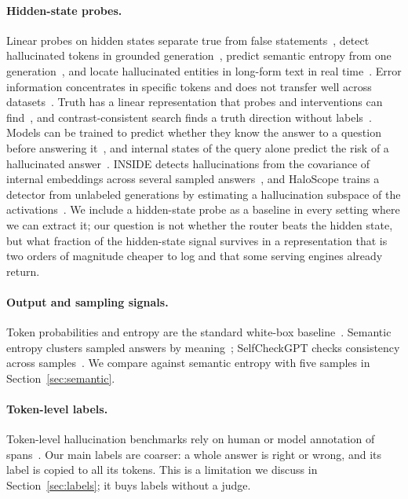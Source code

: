 \documentclass[11pt]{article}
\begin{document}
\paragraph{Hidden-state probes.}
Linear probes on hidden states separate true from false statements~\citep{azaria2023internal}, detect hallucinated tokens in grounded generation~\citep{chwang2024androids}, predict semantic entropy from one generation~\citep{kossen2024semantic}, and locate hallucinated entities in long-form text in real time~\citep{obeso2025realtime}.
Error information concentrates in specific tokens and does not transfer well across datasets~\citep{orgad2025llms}.
Truth has a linear representation that probes and interventions can find~\citep{marks2024geometry}, and contrast-consistent search finds a truth direction without labels~\citep{burns2023discovering}.
Models can be trained to predict whether they know the answer to a question before answering it~\citep{kadavath2022language}, and internal states of the query alone predict the risk of a hallucinated answer~\citep{ji2024llm}.
INSIDE detects hallucinations from the covariance of internal embeddings across several sampled answers~\citep{chen2024inside}, and HaloScope trains a detector from unlabeled generations by estimating a hallucination subspace of the activations~\citep{du2024haloscope}.
We include a hidden-state probe as a baseline in every setting where we can extract it; our question is not whether the router beats the hidden state, but what fraction of the hidden-state signal survives in a representation that is two orders of magnitude cheaper to log and that some serving engines already return.

\paragraph{Output and sampling signals.}
Token probabilities and entropy are the standard white-box baseline~\citep{snyder2024early}.
Semantic entropy clusters sampled answers by meaning~\citep{kuhn2023semantic,farquhar2024detecting}; SelfCheckGPT checks consistency across samples~\citep{manakul2023selfcheckgpt}.
We compare against semantic entropy with five samples in Section~\ref{sec:semantic}.

\paragraph{Token-level labels.}
Token-level hallucination benchmarks rely on human or model annotation of spans~\citep{liu2022token,vazquez2025mushroom}.
Our main labels are coarser: a whole answer is right or wrong, and its label is copied to all its tokens.
This is a limitation we discuss in Section~\ref{sec:labels}; it buys labels without a judge.
\end{document}
